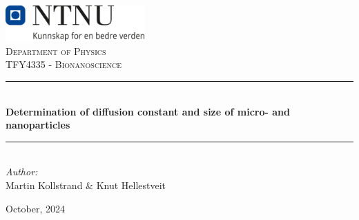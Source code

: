 \begin{titlepage}
\vbox{ }
\vbox{ }
\begin{center}

\includegraphics[width=0.40\textwidth]{Images/NTNU_logo.png}\\[1cm]
\textsc{\LARGE Department of Physics}\\[1.5cm]
\textsc{\Large TFY4335 - Bionanoscience}\\[0.5cm]
\vbox{ }

\rule{\linewidth}{0.5mm} \\[0.4cm]
{ \huge \bfseries Determination of diffusion constant and size of micro- and nanoparticles}\\[0.4cm]
\rule{\linewidth}{0.5mm} \\[1.5cm]

\large
\emph{Author:}\\
Martin Kollstrand \& Knut Hellestveit
\vfill

{\large October, 2024}

\end{center}
\end{titlepage}
